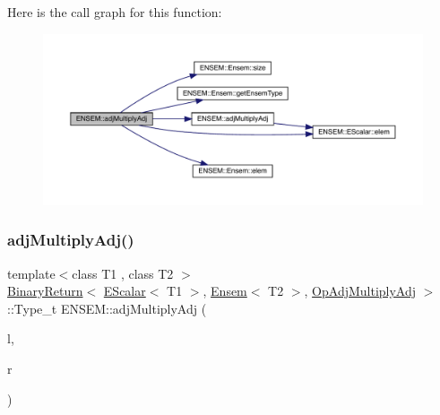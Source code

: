 Here is the call graph for this function\+:\nopagebreak
\begin{figure}[H]
\begin{center}
\leavevmode
\includegraphics[width=350pt]{d1/d9e/group__eensem_gac275cf78eef2b465d5278ed910042f03_cgraph}
\end{center}
\end{figure}
\mbox{\label{group__eensem_ga58683063315813c7adaca604c28f954f}} 
\subsubsection{\texorpdfstring{adjMultiplyAdj()}{adjMultiplyAdj()}\hspace{0.1cm}{\footnotesize\ttfamily [3/3]}}
{\footnotesize\ttfamily template$<$class T1 , class T2 $>$ \\
\mbox{\hyperlink{structENSEM_1_1BinaryReturn}{Binary\+Return}}$<$ \mbox{\hyperlink{classENSEM_1_1EScalar}{E\+Scalar}}$<$ T1 $>$, \mbox{\hyperlink{classENSEM_1_1Ensem}{Ensem}}$<$ T2 $>$, \mbox{\hyperlink{structENSEM_1_1OpAdjMultiplyAdj}{Op\+Adj\+Multiply\+Adj}} $>$\+::Type\+\_\+t E\+N\+S\+E\+M\+::adj\+Multiply\+Adj (\begin{DoxyParamCaption}\item[{const \mbox{\hyperlink{classENSEM_1_1EScalar}{E\+Scalar}}$<$ T1 $>$ \&}]{l,  }\item[{const \mbox{\hyperlink{classENSEM_1_1Ensem}{Ensem}}$<$ T2 $>$ \&}]{r }\end{DoxyParamCaption})\hspace{0.3cm}{\ttfamily [inline]}}

